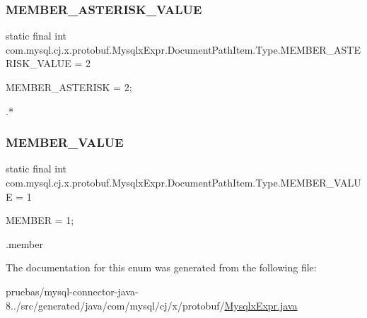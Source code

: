 \subsubsection{\texorpdfstring{M\+E\+M\+B\+E\+R\+\_\+\+A\+S\+T\+E\+R\+I\+S\+K\+\_\+\+V\+A\+L\+UE}{MEMBER\_ASTERISK\_VALUE}}
{\footnotesize\ttfamily  static  final int com.\+mysql.\+cj.\+x.\+protobuf.\+Mysqlx\+Expr.\+Document\+Path\+Item.\+Type.\+M\+E\+M\+B\+E\+R\+\_\+\+A\+S\+T\+E\+R\+I\+S\+K\+\_\+\+V\+A\+L\+UE = 2\hspace{0.3cm}{\ttfamily [static]}}

{\ttfamily M\+E\+M\+B\+E\+R\+\_\+\+A\+S\+T\+E\+R\+I\+SK = 2;}


\begin{DoxyPre}
.*
\end{DoxyPre}
 \mbox{\label{enumcom_1_1mysql_1_1cj_1_1x_1_1protobuf_1_1_mysqlx_expr_1_1_document_path_item_1_1_type_ae83251ee3879d461332876c26a39cb2d}} 
\subsubsection{\texorpdfstring{M\+E\+M\+B\+E\+R\+\_\+\+V\+A\+L\+UE}{MEMBER\_VALUE}}
{\footnotesize\ttfamily  static  final int com.\+mysql.\+cj.\+x.\+protobuf.\+Mysqlx\+Expr.\+Document\+Path\+Item.\+Type.\+M\+E\+M\+B\+E\+R\+\_\+\+V\+A\+L\+UE = 1\hspace{0.3cm}{\ttfamily [static]}}

{\ttfamily M\+E\+M\+B\+ER = 1;}


\begin{DoxyPre}
.member
\end{DoxyPre}
 

The documentation for this enum was generated from the following file\+:\begin{DoxyCompactItemize}
\item 
pruebas/mysql-\/connector-\/java-\/8../src/generated/java/com/mysql/cj/x/protobuf/\mbox{\hyperlink{_mysqlx_expr_8java}{Mysqlx\+Expr.\+java}}\end{DoxyCompactItemize}
